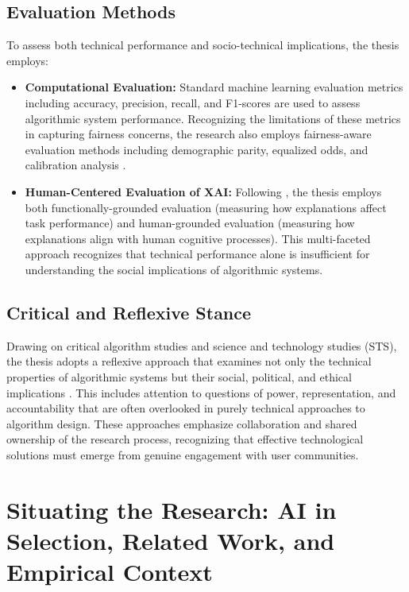 \subsection{Evaluation Methods}\label{ssec:context_evaluation_methods}
To assess both technical performance and socio-technical implications, the thesis employs:
\begin{itemize}
    \item \textbf{Computational Evaluation:} Standard machine learning evaluation metrics including accuracy, precision, recall, and F1-scores are used to assess algorithmic system performance. Recognizing the limitations of these metrics in capturing fairness concerns, the research also employs fairness-aware evaluation methods including demographic parity, equalized odds, and calibration analysis \cite{mehrabi2021survey}.
    \item \textbf{Human-Centered Evaluation of XAI:} Following \textcite{doshi-velez_towards_2017}, the thesis employs both functionally-grounded evaluation (measuring how explanations affect task performance) and human-grounded evaluation (measuring how explanations align with human cognitive processes). This multi-faceted approach recognizes that technical performance alone is insufficient for understanding the social implications of algorithmic systems.
\end{itemize}

\subsection{Critical and Reflexive Stance}\label{ssec:context_reflexivity}
Drawing on critical algorithm studies and science and technology studies (STS), the thesis adopts a reflexive approach that examines not only the technical properties of algorithmic systems but their social, political, and ethical implications \cite{seaver2017algorithms}. This includes attention to questions of power, representation, and accountability that are often overlooked in purely technical approaches to algorithm design. These approaches emphasize collaboration and shared ownership of the research process, recognizing that effective technological solutions must emerge from genuine engagement with user communities.


\section{Situating the Research: AI in Selection, Related Work, and Empirical Context}\label{sec:context_situating_research}

